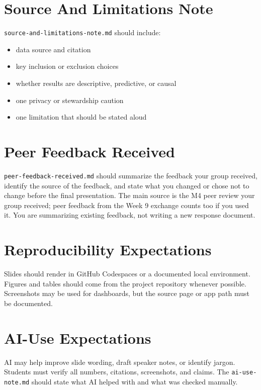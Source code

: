 \documentclass[
  letterpaper,
  DIV=11,
  numbers=noendperiod,
  oneside]{scrreprt}
\providecommand{\tightlist}{%
  \setlength{\itemsep}{0pt}\setlength{\parskip}{0pt}}
\begin{document}
\section{Source And Limitations Note}\label{source-and-limitations-note}

\texttt{source-and-limitations-note.md} should include:

\begin{itemize}
\tightlist
\item
  data source and citation
\item
  key inclusion or exclusion choices
\item
  whether results are descriptive, predictive, or causal
\item
  one privacy or stewardship caution
\item
  one limitation that should be stated aloud
\end{itemize}

\section{Peer Feedback Received}\label{peer-feedback-received}

\texttt{peer-feedback-received.md} should summarize the feedback your
group received, identify the source of the feedback, and state what you
changed or chose not to change before the final presentation. The main
source is the M4 peer review your group received; peer feedback from the
Week 9 exchange counts too if you used it. You are summarizing existing
feedback, not writing a new response document.

\section{Reproducibility
Expectations}\label{reproducibility-expectations-7}

Slides should render in GitHub Codespaces or a documented local
environment. Figures and tables should come from the project repository
whenever possible. Screenshots may be used for dashboards, but the
source page or app path must be documented.

\section{AI-Use Expectations}\label{ai-use-expectations-16}

AI may help improve slide wording, draft speaker notes, or identify
jargon. Students must verify all numbers, citations, screenshots, and
claims. The \texttt{ai-use-note.md} should state what AI helped with and
what was checked manually.
\end{document}
